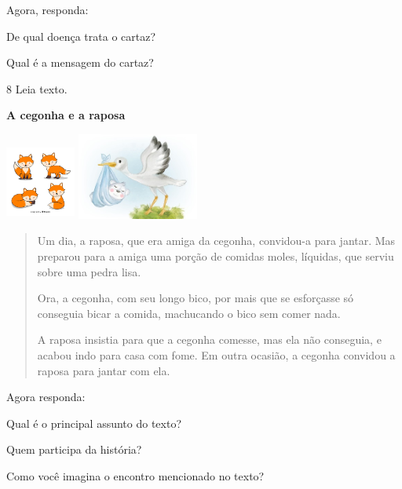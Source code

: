 
Agora, responda:

\begin{escolha}
\item De qual doença trata o cartaz?


\item Qual é a mensagem do cartaz?

\end{escolha}

\num{8} Leia texto.

\textbf{A cegonha e a raposa}

\includegraphics[width=0.90625in,height=0.98597in]{media/image121.jpeg}
\includegraphics[width=1.57292in,height=1.12292in]{media/image122.jpeg}

\begin{quote}
Um dia, a raposa, que era amiga da cegonha, convidou-a para jantar. Mas
preparou para a amiga uma porção de comidas moles, líquidas, que serviu
sobre uma pedra lisa.

Ora, a cegonha, com seu longo bico, por mais que se esforçasse só
conseguia bicar a comida, machucando o bico sem comer nada.

A raposa insistia para que a cegonha comesse, mas ela não conseguia, e
acabou indo para casa com fome. Em outra ocasião, a cegonha convidou a
raposa para jantar com ela.
\end{quote}


Agora responda:

\begin{escolha}
\item Qual é o principal assunto do texto?


\item Quem participa da história?


\item Como você imagina o encontro mencionado no texto? %

\end{escolha}

